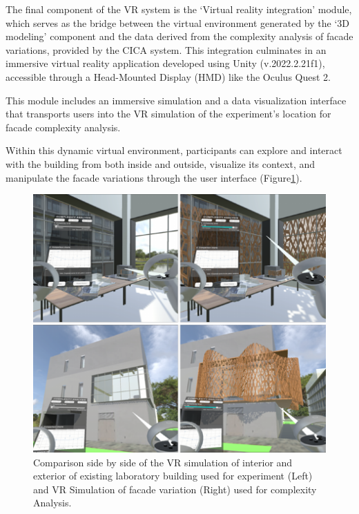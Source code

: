 

The final component of the VR system is the `Virtual reality integration' module, which serves as the bridge between the virtual environment generated by the `3D modeling' component and the data derived from the complexity analysis of facade variations, provided by the CICA system.
This integration culminates in an immersive virtual reality application developed using Unity (v.2022.2.21f1), accessible through a Head-Mounted Display (HMD) like the Oculus Quest 2.


This module includes an immersive simulation and a data visualization interface that transports users into the VR simulation of the experiment's location for facade complexity analysis.

Within this dynamic virtual environment, participants can explore and interact with the building from both inside and outside, visualize its context, and manipulate the facade variations through the user interface (Figure\ref{fig:VRInteriorExterior}).

     \begin{figure}[htb]
          \centering
          \includegraphics[width= \linewidth]{Images/VRInteriorExterior}
          \caption{Comparison side by side of the VR simulation of interior and exterior of existing laboratory building used for experiment (Left) and VR Simulation of facade variation (Right) used for complexity Analysis.}
          \label{fig:VRInteriorExterior}
        \end{figure}

